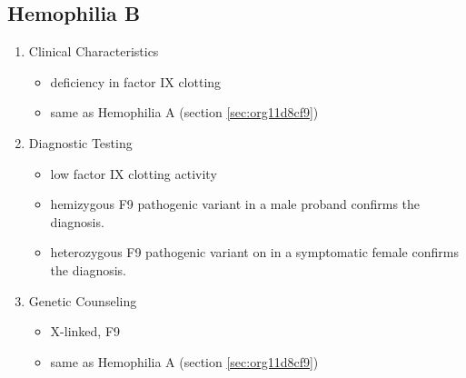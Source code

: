 \documentclass{scrartcl}
\begin{document}
\subsection{Hemophilia B}
\label{sec:orgdddc25c}
\begin{enumerate}
\item Clinical Characteristics
\label{sec:org2998c8f}
\begin{itemize}
\item deficiency in factor IX clotting
\item same as Hemophilia A (section \ref{sec:org11d8cf9})
\end{itemize}
\item Diagnostic Testing
\label{sec:orgce0bc28}
\begin{itemize}
\item low factor IX clotting activity
\item hemizygous F9 pathogenic variant in a male proband confirms the
diagnosis.
\item heterozygous F9 pathogenic variant on in a symptomatic female
confirms the diagnosis.
\end{itemize}
\item Genetic Counseling
\label{sec:orge533284}
\begin{itemize}
\item X-linked, F9
\item same as Hemophilia A (section \ref{sec:org11d8cf9})
\end{itemize}
\end{enumerate}
\end{document}
